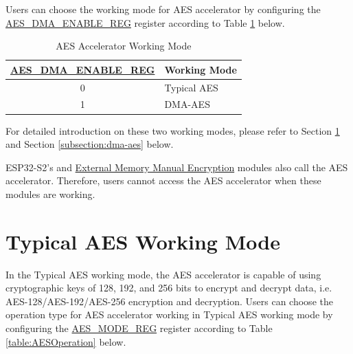 \documentclass[main\_\_EN.tex]{subfiles}
\begin{document}
Users can choose the working mode for AES accelerator by configuring the \hyperref[regdesc:AESDMAENABLEREG]{AES\_DMA\_ENABLE\_REG} register according to Table \ref{table:AES_DMA_ENABLE} below.

\begin{longtable}[c]{ | c | l | }
\caption{AES Accelerator Working Mode}
    \label{table:AES_DMA_ENABLE}
    \\\hline
    \rowcolor{lightgray}
\hyperref[regdesc:AESDMAENABLEREG]{AES\_DMA\_ENABLE\_REG}       & Working Mode\\
        \hline
        0                       & Typical AES    \\
        \hline
        1                       & DMA-AES        \\
        \hline
\end{longtable}



For detailed introduction on these two working modes, please refer to Section \ref{subsection:typicalaes} and Section \ref{subsection:dma-aes} below.

\begin{importantlisting}
\vspace{-0.5em}

    ESP32-S2's  and \hyperref[mod:extmemencr]{External Memory Manual Encryption} modules also call the AES accelerator. Therefore, users cannot access the AES accelerator when these modules are working.
\end{importantlisting}

\section{Typical AES Working Mode}\label{subsection:typicalaes}

In the Typical AES working mode, the AES accelerator is capable of using cryptographic keys of 128, 192, and 256 bits to encrypt and decrypt data, i.e. AES-128/AES-192/AES-256 encryption and decryption. Users can choose the operation type for AES accelerator working in Typical AES working mode by configuring the \hyperref[regdesc:AESMODEREG]{AES\_MODE\_REG} register according to Table \ref{table:AESOperation} below.
\end{document}
